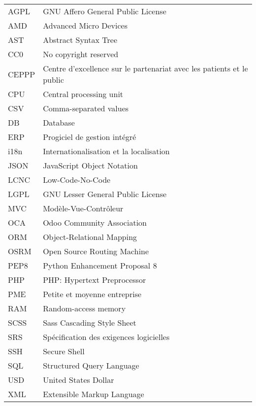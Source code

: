 \chapter*{\abbrevname}
\pagestyle{pagenumber}
%
\begin{acronym}
\end{acronym}
%
\begin{longtable}{lp{5in}}
AGPL      & GNU Affero General Public License\\
AMD       & Advanced Micro Devices\\
AST       & Abstract Syntax Tree\\
CC0       & No copyright reserved\\
CEPPP     & Centre d'excellence sur le partenariat avec les patients et le public\\
CPU       & Central processing unit\\
CSV       & Comma-separated values\\
DB        & Database\\
ERP       & Progiciel de gestion intégré\\
i18n      & Internationalisation et la localisation\\
JSON      & JavaScript Object Notation\\
LCNC      & Low-Code-No-Code\\
LGPL      & GNU Lesser General Public License\\
MVC       & Modèle-Vue-Contrôleur\\
OCA       & Odoo Community Association\\
ORM       & Object-Relational Mapping\\
OSRM      & Open Source Routing Machine\\
PEP8      & Python Enhancement Proposal 8\\
PHP       & PHP: Hypertext Preprocessor\\
PME       & Petite et moyenne entreprise\\
RAM       & Random-access memory\\
SCSS      & Sass Cascading Style Sheet\\
SRS       & Spécification des exigences logicielles\\
SSH       & Secure Shell\\
SQL       & Structured Query Language\\
USD       & United States Dollar\\
XML       & Extensible Markup Language\\

\end{longtable}
